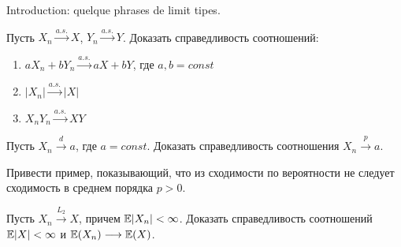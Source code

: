 
Introduction: quelque phrases de limit tipes.


\begin{problem}
Пусть $X_n \overset{a.s.}{\longrightarrow} X$, $Y_n \overset{a.s.}{\longrightarrow} Y$. Доказать справедливость соотношений:
\begin{enumerate}
\item $a X_n + b Y_n \overset{a.s.}{\longrightarrow} a X + b Y$, где  $a, b = const$
\item $|X_n| \overset{a.s.}{\longrightarrow} |X|$
\item $X_n Y_n \overset{a.s.}{\longrightarrow} XY$
\end{enumerate}

\end{problem}

\begin{problem}
Пусть $X_n \overset{d}{\longrightarrow} a$, где $a = const$. Доказать справедливость соотношения $X_n \overset{p}{\longrightarrow} a$.
\end{problem}

\begin{problem}
Привести пример, показывающий, что из сходимости по вероятности не следует сходимость в среднем порядка $p > 0$.
\end{problem}

\begin{problem}
Пусть $X_n \overset{L_2}{\longrightarrow} X$, причем $\mathrm{{\mathbb E}} |X_n| < \infty$. Доказать справедливость соотношений $\mathrm{{\mathbb E}} |X| < \infty$ и $\mathrm{{\mathbb E}} (X_n)\longrightarrow \mathrm{{\mathbb E}}(X)$.
\end{problem}

